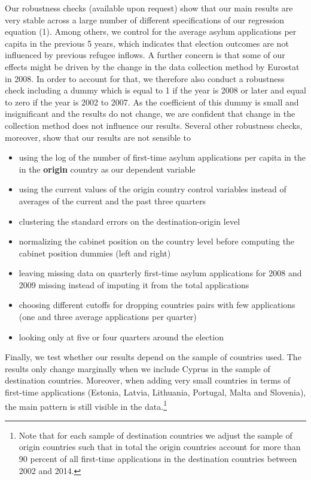 \documentclass[a4paper,12pt]{article}
\begin{document}
Our robustness checks (available upon request) show that our main results are very stable across a large number of different specifications of our regression equation (1). Among others, we control for the average asylum applications per capita in the previous 5 years, which indicates that election outcomes are not influenced by previous refugee inflows.  A further concern is that some of our effects might be driven by the change in the data collection method by Eurostat in 2008. In order to account for that, we therefore also conduct a robustness check including a dummy which is equal to 1 if the year is 2008 or later and equal to zero if the year is 2002 to 2007. As the coefficient of this dummy is small and insignificant and the results do not change, we are confident that change in the collection method does not influence our results. Several other robustness checks, moreover,  show that our results are not sensible to
\begin{itemize}
\itemsep0em 
\item  using the log of the number of first-time asylum applications per capita in the in the \textbf{origin} country as our dependent variable 
\item using  the current values of the origin country control variables instead of averages of the current and the past three quarters 
\item clustering the standard errors on the destination-origin level
\item normalizing the cabinet position on the country level before computing the cabinet position dummies (left and right)
\item leaving missing data on quarterly  first-time asylum applications for 2008 and 2009 missing instead of imputing it from the total applications
\item choosing  different cutoffs  for dropping countries pairs with few applications (one and three average applications per quarter)
\item looking only at five or four quarters around the election 
\end{itemize}
Finally, we test whether our results depend on the sample of countries used. The results only change marginally  when we include Cyprus in the sample of destination countries. Moreover, when adding very small countries in terms of first-time applications (Estonia, Latvia, Lithuania, Portugal, Malta and Slovenia), the main pattern is still visible in the data.\footnote{Note that for each sample of destination countries we adjust the sample of origin countries such that in total the origin countries account for more than 90 percent of all first-time applications in the destination countries between 2002 and 2014.}  
\end{document}
